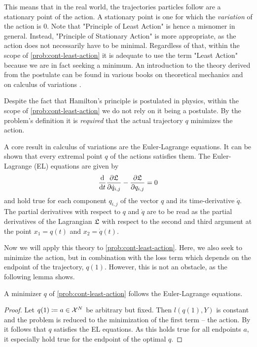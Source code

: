 This means that in the real world, the trajectories particles follow are a stationary point of the action.
A stationary point is one for which the \emph{variation} of the action is $0$.
Note that "Principle of Least Action" is hence a misnomer in general.
Instead, "Principle of Stationary Action" is more appropriate, as the action does not necessarily have to be minimal.
Regardless of that, within the scope of \cref{prob:cont-least-action} it is adequate to use the term "Least Action" because we are in fact seeking a minimum.
An introduction to the theory derived from the postulate can be found in various books on theoretical mechanics \cite{goldstein01, marsden10, feynman63} and on calculus of variations \cite{kielhofer18}.

Despite the fact that Hamilton's principle is postulated in physics, within the scope of \cref{prob:cont-least-action} we do not rely on it being a postulate.
By the problem's definition it is \emph{required} that the actual trajectory $q$ minimizes the action.

A core result in calculus of variations are the Euler-Lagrange equations.
It can be shown that every extremal point $q$ of the actions satisfies them.
The Euler-Lagrange (EL) equations  are given by
\begin{equation}
\frac{\mathrm{d}}{\mathrm{d}t} \frac{\partial \mathfrak{L}}{\partial \dot{q}_{i, j}} - \frac{\partial \mathfrak{L}}{\partial q_{i, j}} = 0
\end{equation}
and hold true for each component $q_{i, j}$ of the vector $q$ and its time-derivative $\dot{q}$.
The partial derivatives with respect to $q$ and $\dot{q}$ are to be read as the partial derivatives of the Lagrangian $\mathfrak{L}$ with respect to the second and third argument at the point $x_1 = q(t)$ and $x_2 = \dot{q}(t)$.

Now we will apply this theory to \cref{prob:cont-least-action}.
Here, we also seek to minimize the action, but in combination with the loss term which depends on the endpoint of the trajectory, $q(1)$.
However, this is not an obstacle, as the following lemma shows.
\begin{lemma}
	A minimizer $q$ of \cref{prob:cont-least-action} follows the Euler-Lagrange equations.
\end{lemma}
\begin{proof}
	Let $q(1) \coloneqq a \in \mathcal{X}^N$ be arbitrary but fixed.
	Then $l(q(1), Y)$ is constant and the problem is reduced to the minimization of the first term -- the action.
	By \cite[~Proposition 1.4.1]{kielhofer18} it follows that $q$ satisfies the EL equations.
	As this holds true for all endpoints $a$, it especially hold true for the endpoint of the optimal $q$.
\end{proof}

